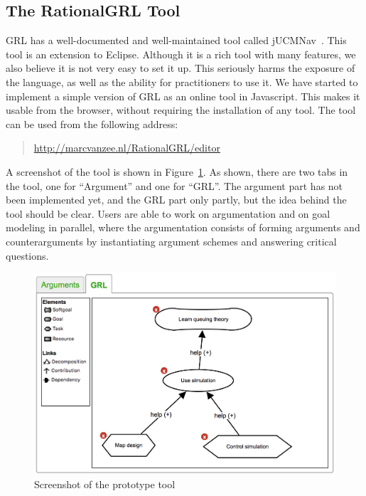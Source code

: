 \subsection{The RationalGRL Tool}
\label{sect:tool}

GRL has a well-documented and well-maintained tool called jUCMNav~\cite{jUCMNav}. This tool is an extension to Eclipse. Although it is a rich tool with many features, we also believe it is not very easy to set it up. This seriously harms the exposure of the language, as well as the ability for practitioners to use it. We have started to implement a simple version of GRL as an online tool in Javascript. This makes it usable from the browser, without requiring the installation of any tool. The tool can be used from the following address:

\begin{quote}
\url{http://marcvanzee.nl/RationalGRL/editor}
\end{quote}

A screenshot of the tool is shown in Figure~\ref{fig:goalmodeling:tool}. As shown, there are two tabs in the tool, one for ``Argument'' and one for ``GRL''. The argument part has not been implemented yet, and the GRL part only partly, but the idea behind the tool should be clear. Users are able to work on argumentation and on goal modeling in parallel, where the argumentation consists of forming arguments and counterarguments by instantiating argument schemes and answering critical questions. 

\begin{figure}[h!]
\centering
\includegraphics[scale=0.5]{img/tool_screen}
\caption{Screenshot of the prototype tool}
\label{fig:goalmodeling:tool}
\end{figure}

